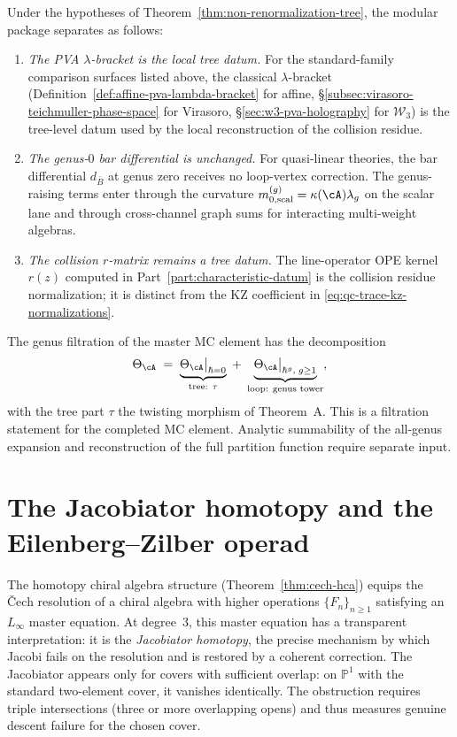 \begin{remark}
\label{rem:non-renorm-modular-consequences}
Under the hypotheses of Theorem~\ref{thm:non-renormalization-tree},
the modular package separates as follows:
\begin{enumerate}[label=\textup{(\roman*)},nosep]
\item \emph{The PVA $\lambda$-bracket is the local tree datum.} For
 the standard-family comparison surfaces listed above, the classical
 $\lambda$-bracket
 (Definition~\ref{def:affine-pva-lambda-bracket} for affine,
 \S\ref{subsec:virasoro-teichmuller-phase-space} for Virasoro,
 \S\ref{sec:w3-pva-holography} for $\mathcal{W}_3$) is the
 tree-level datum used by the local reconstruction of the collision
 residue.
\item \emph{The genus-$0$ bar differential is unchanged.} For
 quasi-linear theories,
 the bar differential $d_{\bar{B}}$ at genus zero receives no
 loop-vertex correction.  The genus-raising terms enter through the
 curvature $m_{0,\mathrm{scal}}^{(g)}=\kappa(\cA)\lambda_g$ on the
 scalar lane and through cross-channel graph sums for interacting
 multi-weight algebras.
\item \emph{The collision $r$-matrix remains a tree datum.} The
 line-operator OPE kernel $r(z)$ computed in
 Part~\ref{part:characteristic-datum} is the collision residue
 normalization; it is distinct from the KZ coefficient in
 \eqref{eq:qc-trace-kz-normalizations}.
\end{enumerate}
The genus filtration of the master MC element has the decomposition
\[
 \Theta_{\cA}
 \;=\;
 \underbrace{\Theta_{\cA}\big|_{\hbar=0}}_{\text{tree: }\tau}
 \;+\;
 \underbrace{\Theta_{\cA}\big|_{\hbar^g,\;g \geq 1}}_{\text{loop: genus tower}},
\]
with the tree part $\tau$ the twisting morphism of Theorem~A.  This is
a filtration statement for the completed MC element.  Analytic
summability of the all-genus expansion and reconstruction of the full
partition function require separate input.
\end{remark}

\section{The Jacobiator homotopy and the Eilenberg--Zilber operad}
\label{sec:jacobiator-homotopy}

The homotopy chiral algebra structure
(Theorem~\ref{thm:cech-hca}) equips the \v{C}ech resolution of a
chiral algebra with higher operations $\{F_n\}_{n \geq 1}$
satisfying an $L_\infty$ master equation. At degree~$3$, this
master equation has a transparent interpretation: it is the
\emph{Jacobiator homotopy}, the precise mechanism by which Jacobi
fails on the resolution and is restored by a coherent correction.
The Jacobiator appears only for covers with sufficient overlap: on
$\mathbb{P}^1$ with the standard two-element cover, it vanishes
identically. The obstruction requires triple intersections (three
or more overlapping opens) and thus measures genuine descent failure
for the chosen cover.

